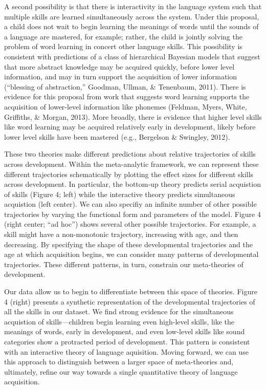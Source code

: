 \documentclass[english,floatsintext,man]{apa6}
\begin{document}
A second possibility is that there is interactivity in the language
system such that multiple skills are learned simultaneously across the
system. Under this proposal, a child does not wait to begin learning the
meanings of words until the sounds of a language are mastered, for
example; rather, the child is jointly solving the problem of word
learning in concert other language skills. This possibility is
consistent with predictions of a class of hierarchical Bayesian models
that suggest that more abstract knowledge may be acquired quickly,
before lower level information, and may in turn support the acquisition
of lower information (``blessing of abstraction,'' Goodman, Ullman, \&
Tenenbaum, 2011). There is evidence for this proposal from work that
suggests word learning supports the acquisition of lower-level
information like phonemes (Feldman, Myers, White, Griffiths, \& Morgan,
2013). More broadly, there is evidence that higher level skills like
word learning may be acquired relatively early in development, likely
before lower level skills have been mastered (e.g., Bergelson \&
Swingley, 2012).

These two theories make different predictions about relative
trajectories of skills across development. Within the meta-analytic
framework, we can represent these different trajectories schematically
by plotting the effect sizes for different skills across development. In
particular, the bottom-up theory predicts serial acquistion of skills
(Figure 4; left) while the interactive theory predicts simultaneous
acquistion (left center). We can also specifiy an infinite number of
other possible trajectories by varying the functional form and
parameters of the model. Figure 4 (right center; \enquote{ad hoc}) shows
several other possible trajectories. For example, a skill might have a
non-monotonic trajectory, increasing with age, and then decreasing. By
specifying the shape of these developmental trajectories and the age at
which acquisition begins, we can consider many patterns of developmental
trajectories. These different patterns, in turn, constrain our
meta-theories of development.

Our data allow us to begin to differentiate between this space of
theories. Figure 4 (right) presents a synthetic representation of the
developmental trajectories of all the skills in our dataset. We find
strong evidence for the simultaneous acquistion of skills---children
begin learning even high-level skills, like the meanings of words, early
in development, and even low-level skills like sound categories show a
protracted period of development. This pattern is consistent with an
interactive theory of language aquisition. Moving forward, we can use
this approach to distinguish between a larger space of meta-theories
and, ultimately, refine our way towards a single quantitative theory of
language acquisition.
\end{document}
